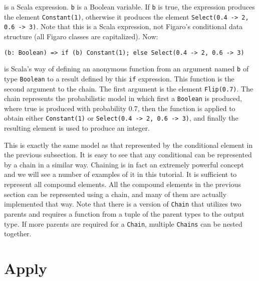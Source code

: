 is a Scala expression. \texttt{b} is a Boolean variable. If \texttt{b} is true, the expression produces the element \texttt{Constant(1)}, otherwise it produces the element \texttt{Select(0.4 -> 2, 0.6 -> 3)}. Note that this is a Scala expression, not Figaro's conditional data structure (all Figaro classes are capitalized). Now:
 
\begin{flushleft}
\texttt{(b: Boolean) =>
\newline \tab if (b) Constant(1); else Select(0.4 -> 2, 0.6 -> 3)}
\end{flushleft}

is Scala's way of defining an anonymous function from an argument named \texttt{b} of type \texttt{Boolean} to a result defined by this \texttt{if} expression. This function is the second argument to the chain. The first argument is the element \texttt{Flip(0.7)}. The chain represents the probabilistic model in which first a \texttt{Boolean} is produced, where true is produced with probability 0.7, then the function is applied to obtain either \texttt{Constant(1)} or \texttt{Select(0.4 -> 2, 0.6 -> 3)}, and finally the resulting element is used to produce an integer.

This is exactly the same model as that represented by the conditional element in the previous subsection. It is easy to see that any conditional can be represented by a chain in a similar way. Chaining is in fact an extremely powerful concept and we will see a number of examples of it in this tutorial. It is sufficient to represent all compound elements. All the compound elements in the previous section can be
represented using a chain, and many of them are actually implemented that way. Note that there is a version of \texttt{Chain} that utilizes two parents and requires a function from a tuple of the parent types to the output type. If more parents are required for a \texttt{Chain}, multiple \texttt{Chains} can be nested together.

\section{Apply}


